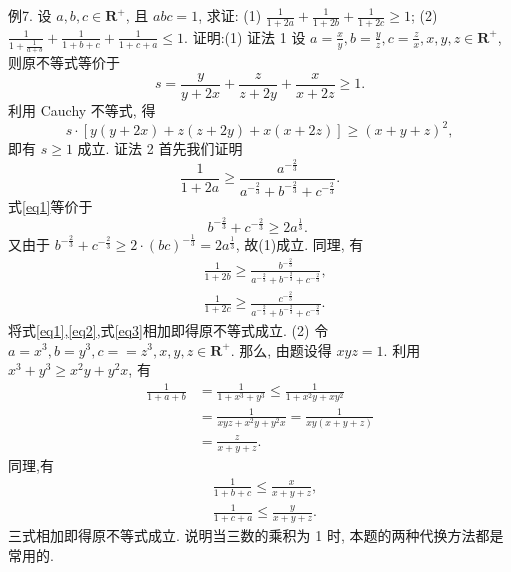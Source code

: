 例7. 设 $a, b, c \in \mathbf{R}^{+}$, 且 $a b c=1$, 求证:
(1) $\frac{1}{1+2 a}+\frac{1}{1+2 b}+\frac{1}{1+2 c} \geqslant 1$;
(2) $\frac{1}{1+\frac{1}{a+b}}+\frac{1}{1+b+c}+\frac{1}{1+c+a} \leqslant 1$.
证明:(1) 证法 1 设 $a=\frac{x}{y}, b=\frac{y}{z}, c=\frac{z}{x}, x, y, z \in \mathbf{R}^{+}$, 则原不等式等价于
$$
s=\frac{y}{y+2 x}+\frac{z}{z+2 y}+\frac{x}{x+2 z} \geqslant 1 .
$$
利用 Cauchy 不等式, 得
$$
s \cdot[y(y+2 x)+z(z+2 y)+x(x+2 z)] \geqslant(x+y+z)^2,
$$
即有 $s \geqslant 1$ 成立.
证法 2 首先我们证明
$$
\frac{1}{1+2 a} \geqslant \frac{a^{-\frac{2}{3}}}{a^{-\frac{2}{3}}+b^{-\frac{2}{3}}+c^{-\frac{2}{3}}} . \label{eq1}
$$
式\ref{eq1}等价于
$$
b^{-\frac{2}{3}}+c^{-\frac{2}{3}} \geqslant 2 a^{\frac{1}{3}} \text {. }
$$
又由于 $b^{-\frac{2}{3}}+c^{-\frac{2}{3}} \geqslant 2 \cdot(b c)^{-\frac{1}{3}}=2 a^{\frac{1}{3}}$, 故(1)成立.
同理, 有
$$
\begin{aligned}
& \frac{1}{1+2 b} \geqslant \frac{b^{-\frac{2}{3}}}{a^{-\frac{2}{3}}+b^{-\frac{2}{3}}+c^{-\frac{2}{3}}}, \label{eq2} \\
& \frac{1}{1+2 c} \geqslant \frac{c^{-\frac{2}{3}}}{a^{-\frac{2}{3}}+b^{-\frac{2}{3}}+c^{-\frac{2}{3}}} . \label{eq3}
\end{aligned}
$$
将式\ref{eq1},\ref{eq2},式\ref{eq3}相加即得原不等式成立.
(2) 令 $a=x^3, b=y^3, c==z^3, x, y, z \in \mathbf{R}^{+}$. 那么, 由题设得 $x y z=1$. 利用 $x^3+y^3 \geqslant x^2 y+y^2 x$, 有
$$
\begin{aligned}
\frac{1}{1+a+b} & =\frac{1}{1+x^3+y^3} \leqslant \frac{1}{1+x^2 y+x y^2} \\
& =\frac{1}{x y z+x^2 y+y^2 x}=\frac{1}{x y(x+y+z)} \\
& =\frac{z}{x+y+z} .
\end{aligned}
$$
同理,有
$$
\begin{aligned}
& \frac{1}{1+b+c} \leqslant \frac{x}{x+y+z}, \\
& \frac{1}{1+c+a} \leqslant \frac{y}{x+y+z} .
\end{aligned}
$$
三式相加即得原不等式成立.
说明当三数的乘积为 1 时, 本题的两种代换方法都是常用的.



